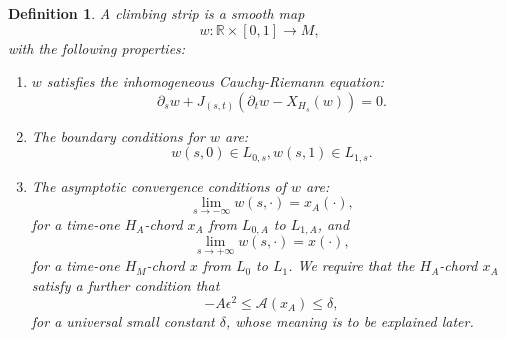\documentclass{amsart}
\newtheorem{definition}[theorem]{Definition}
\numberwithin{equation}{section}
\numberwithin{figure}{section}
\begin{document}
\begin{definition}
	A climbing strip is a smooth map
\begin{equation*}
w: \mathbb{R} \times [0, 1] \to M,
\end{equation*}
with the following properties:
\begin{enumerate}[label=(\roman*)]

\item $w$ satisfies the inhomogeneous Cauchy-Riemann equation:
\begin{equation}\label{inhomogeneous Cauchy-Riemann equation for climbing strips}
\partial_{s} w + J_{(s, t)}(\partial_{t} w - X_{H_{s}}(w)) = 0.
\end{equation}

\item The boundary conditions for $w$ are:
\begin{equation}
w(s, 0) \in L_{0, s}, w(s, 1) \in L_{1, s}.
\end{equation}

\item The asymptotic convergence conditions of $w$ are:
\begin{equation*}
\lim\limits_{s \to -\infty} w(s, \cdot) = x_{A}(\cdot),
\end{equation*}
for a time-one $H_{A}$-chord $x_{A}$ from $L_{0, A}$ to $L_{1, A}$, and
\begin{equation*}
\lim\limits_{s \to +\infty} w(s, \cdot) = x(\cdot),
\end{equation*}
for a time-one $H_{M}$-chord $x$ from $L_{0}$ to $L_{1}$. We require that the $H_{A}$-chord $x_{A}$ satisfy a further condition that
\begin{equation}\label{action constraint for the inner chord}
- A\epsilon^{2} \le \mathcal{A}(x_{A}) \le \delta,
\end{equation}
for a universal small constant $\delta$, whose meaning is to be explained later.

\end{enumerate}

\end{definition}
\end{document}
